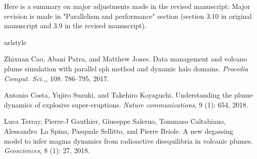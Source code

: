 \documentclass{article}
\begin{document}
Here is a summary on major adjustments made in the revised manuscript: 
Major revision is made in "Parallelism and performance" section (section 3.10 in original manuscript and 3.9 in the revised manuscript). 
\begin{thebibliography}{3}
\providecommand{\natexlab}[1]{#1}
\providecommand{\url}[1]{\texttt{#1}}
\expandafter\ifx\csname urlstyle\endcsname\relax
  \providecommand{\doi}[1]{doi: #1}\else
  \providecommand{\doi}{doi: \begingroup \urlstyle{rm}\Url}\fi

Zhixuan Cao, Abani Patra, and Matthew Jones.
\newblock Data management and volcano plume simulation with parallel sph method
  and dynamic halo domains.
\newblock \emph{Procedia Comput. Sci.,}, 108: 786--795, 2017.

Antonio Costa, Yujiro Suzuki, and Takehiro Koyaguchi.
\newblock Understanding the plume dynamics of explosive super-eruptions.
\newblock \emph{Nature communications}, 9 (1): 654, 2018.

Luca Terray, Pierre-J Gauthier, Giuseppe Salerno, Tommaso Caltabiano,
  Alessandro~La Spina, Pasquale Sellitto, and Pierre Briole.
\newblock A new degassing model to infer magma dynamics from radioactive
  disequilibria in volcanic plumes.
\newblock \emph{Geosciences}, 8 (1): 27, 2018.

\end{thebibliography}
%
%
\end{document}
